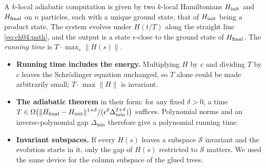 \documentclass[handoutsbeamer.tex]{subfiles}
\begin{document}
\begin{frame}
\onp{\footnotesize}
\begin{defn}
A $k$-local adiabatic computation is given by two $k$-local Hamiltonians $H_{\rm init}$ and $H_{\rm final}$ on $n$ particles, each with a unique ground state, that of $H_{\rm init}$ being a product state. The system evolves under $H(t/T)$ along the straight line \eqref{eq:ch04:path}, and the output is a state $\epsilon$-close to the ground state of $H_{\rm final}$. The \emph{running time} is $T\cdot\max_s\|H(s)\|$.
\end{defn}
\begin{itemize}\setlength\itemsep{0.25em}
    \item \textbf{Running time includes the energy.} Multiplying $H$ by $c$ and dividing $T$ by $c$ leaves the Schrödinger equation unchanged, so $T$ alone could be made arbitrarily small; $T\cdot\max\|H\|$ is invariant.
    \item \textbf{The adiabatic theorem} in their form: for any fixed $\delta>0$, a time $T \in \Omega\big(\|H_{\rm final}-H_{\rm init}\|^{1+\delta}/(\epsilon^\delta\Delta_{\min}^{2+\delta})\big)$ suffices. Polynomial norms and an inverse-polynomial gap $\Delta_{\min}$ therefore give a polynomial running time.
    \item \textbf{Invariant subspaces.} If every $H(s)$ leaves a subspace $\mathcal S$ invariant and the evolution starts in it, only the gap of $H(s)$ restricted to $\mathcal S$ matters. We used the same device for the column subspace of the glued trees.
\end{itemize}
\end{frame}
\end{document}
